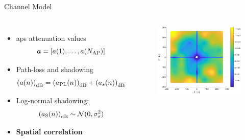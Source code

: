 \documentclass[10pt]{beamer}
\begin{document}
\begin{frame}{Channel Model}
\begin{columns}
	\fontsize{9}{9}
	\begin{itemize}
		\item \acp{ap} attenuation values $$\bm{a}=[a(1),\ldots,a(N_{\rm AP})]$$
		\item Path-loss and shadowing
		\begin{equation*}
		\left(a{(n)}\right)_{\rm dB} = \left(a_{\rm PL}{(n)}\right)_{\rm dB} + \left(a_s{(n)}\right)_{\rm dB}
		\end{equation*}
		\item Log-normal shadowing:  
		$$\left(a_{\rm S}{(n)}\right)_{\rm dB} \sim \mathcal{N}(0,\sigma_s^2)$$ 
		\item \textbf{Spatial correlation}
	\end{itemize}
	\begin{figure}[t]
		\centering
		\includegraphics[width=\textwidth]{map.eps}
	\end{figure}
\end{columns}
\end{frame}
\end{document}
